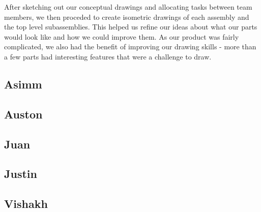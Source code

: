 After sketching out our conceptual drawings and allocating tasks between team members, we then proceded to create isometric drawings of each assembly and the top level subassemblies.
This helped us refine our ideas about what our parts would look like and how we could improve them.
As our product was fairly complicated, we also had the benefit of improving our drawing skills - more than a few parts had interesting features that were a challenge to draw.

\subsection{Asimm}


\subsection{Auston}


\subsection{Juan}


\subsection{Justin}


\subsection{Vishakh}

